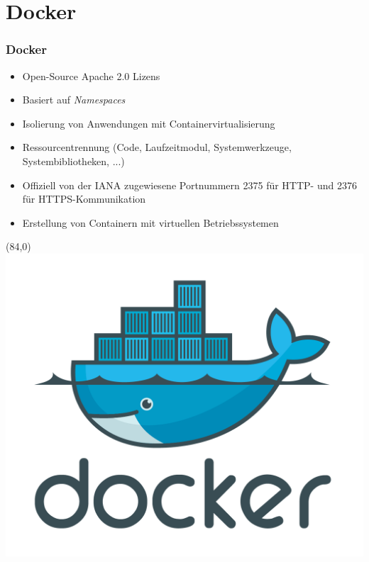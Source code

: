 \documentclass{beamer}
\begin{document}
\section{Docker}
\begin{frame}

\frametitle{Docker}

\begin{itemize}
\setlength{\itemsep}{12pt}
\item Open-Source Apache 2.0 Lizens
\item Basiert auf \textit{Namespaces}
\item Isolierung von Anwendungen mit Containervirtualisierung
\item Ressourcentrennung (Code, Laufzeitmodul, Systemwerkzeuge, Systembibliotheken, ...)
\item Offiziell von der IANA zugewiesene Portnummern 2375 für HTTP- und 2376 für HTTPS-Kommunikation
\item Erstellung von Containern mit virtuellen Betriebssystemen
\end{itemize}

\begin{textblock}{20}(84,0)
\includegraphics[scale=0.22]{docker.png}
\end{textblock}

\end{frame}
\end{document}
